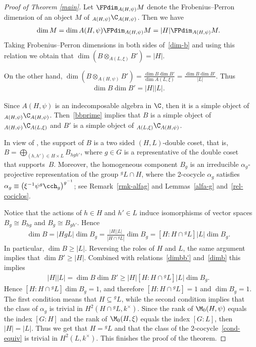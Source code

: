 \begin{proof}[Proof of Theorem \ref{main}]
Let $\FPdim_{A(H, \psi)}M$ denote the Frobenius--Perron dimension of an object $M$ of $_{A(H, \psi)}\C_{A(H, \psi)}$. Then we have
\begin{gather*}\dim M = \dim A(H, \psi) \FPdim_{A(H, \psi)}M = |H| \FPdim_{A(H, \psi)}M.\end{gather*}
Taking Frobenius--Perron dimensions in both sides of~\eqref{dim-b} and using this relation we obtain that $\dim \left(B \otimes_{A(L, \xi)}B'\right) = |H|$.

On the other hand, $\dim (B \otimes_{A(H, \psi)}B' ) = \frac{\dim B \dim B'}{\dim{A(L, \xi)}} = \frac{\dim B \dim B'}{|L|}$. Thus
\begin{gather}\label{dimbb'} \dim B \dim B' = |H| |L|. \end{gather}

Since $A(H, \psi)$ is an indecomposable algebra in $\C$, then it is a simple object of $_{A(H, \psi)}\C_{A(H, \psi)}$. Then~\eqref{bbprime} implies that $B$ is a simple object of $_{A(H, \psi)}\C_{A(L, \xi)}$ and $B'$ is a simple object of $_{A(L, \xi)}\C_{A(H, \psi)}$.

In view of \cite[Proposition~3.2]{ostrik}, the support of $B$ is a two sided $(H, L)$-double coset, that is, $B = \bigoplus_{(h,h') \in H \times L} B_{hgh'}$, where $g \in G$ is a representative of the double coset that supports~$B$. Moreover, the homogeneous component $B_g$ is an irreducible $\alpha_g$-projective representation of the group $^gL \cap H$, where the 2-cocycle $\alpha_g$ satisf\/ies~$\alpha_g \equiv \big(\xi^{-1}\psi^g \cch_g\big)^{g^{-1}}$; see Remark~\ref{rmk-alfag} and Lemmas~\ref{alfa-g} and~\ref{rel-cociclos}.

Notice that the actions of $h \in H$ and $h'\in L$ induce isomorphisms of vector spaces $B_{g} \cong B_{hg}$ and $B_{g} \cong B_{gh'}$. Hence
\begin{gather}\label{dimb}\dim B = |HgL| \dim B_g = \frac{|H| |L|}{|H \cap {} ^gL|} \dim B_g = [H: H \cap {}^gL] |L| \dim B_g.\end{gather}
In particular, $\dim B \geq |L|$. Reversing the roles of $H$ and $L$, the same argument implies that $\dim B' \geq |H|$. Combined with relations~\eqref{dimbb'} and~\eqref{dimb} this implies
\begin{gather*}|H| |L| = \dim B \dim B' \geq |H| [H : H \cap {}^gL] |L| \dim B_g.\end{gather*}
Hence $[H\colon H \cap {}^gL] \dim B_g = 1$, and therefore $[H\colon H \cap {}^gL] = 1$ and $\dim B_g = 1$. The f\/irst condition means that $H \subseteq {}^gL$, while the second condition implies that the class of $\alpha_g$ is trivial in $H^2(H \cap {}^gL, k^\times)$. Since the rank of $\M_0(H, \psi)$ equals the index $[G:H]$ and the rank of $\M_0(H, \xi)$ equals the index $[G:L]$, then $|H| = |L|$. Thus we get that $H = {}^gL$ and that the class of the 2-cocycle~\eqref{cond-equiv} is trivial in $H^2(L, k^\times)$. This f\/inishes the proof of the theorem.
 \end{proof}

